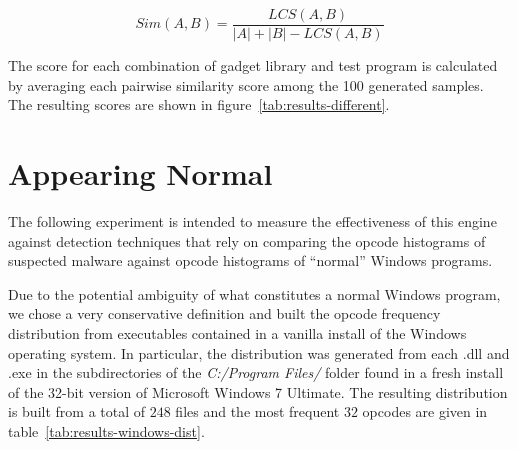 \documentclass[finalcopy,short]{srpaper}
\begin{document}
        $$Sim(A,B) = \frac{LCS(A,B)}{|A| + |B| - LCS(A,B)}$$

        The score for each combination of gadget library and test program is
        calculated by averaging each pairwise similarity score among the 100
        generated samples.  The resulting scores are shown in
        figure~\ref{tab:results-different}. 

    \section{Appearing Normal}

        The following experiment is intended to measure the effectiveness of
        this engine against detection techniques that rely on comparing the
        opcode histograms of suspected malware against opcode histograms of
        ``normal'' Windows programs.

        Due to the potential ambiguity of what constitutes a normal Windows
        program, we chose a very conservative definition and built the opcode
        frequency distribution from executables contained in a vanilla install
        of the Windows operating system. In particular, the distribution was
        generated from each {.dll} and {.exe} in the subdirectories of the
        \emph{C:/Program Files/} folder found in a fresh install of the 32-bit
        version of Microsoft Windows 7 Ultimate. The resulting distribution is
        built from a total of $248$ files and the most frequent $32$ opcodes are
        given in table~\ref{tab:results-windows-dist}.
\end{document}
